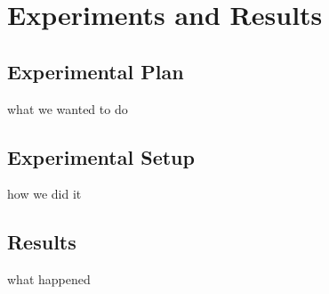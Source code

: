\chapter{Experiments and Results}
\label{cha:experiments_and_results}

\section{Experimental Plan}
what we wanted to do

\section{Experimental Setup}
how we did it

\section{Results}
what happened

\cleardoublepage